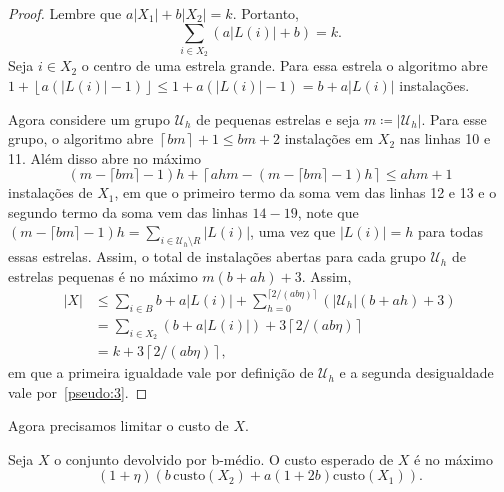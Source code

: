 \begin{proof}
    Lembre que $a|X_1| + b|X_2| = k$. Portanto,
    \begin{equation}
        \sum_{i \in X_2}(a|L(i)| + b) = k. \label{pseudo:3}
    \end{equation}
    Seja $i \in X_2$ o centro de uma estrela grande. %
    Para essa estrela o algoritmo abre ${1 + \left \lfloor a(|L(i)| - 1) \right \rfloor \leq 1 + a(|L(i)| - 1) = b + a|L(i)|}$ instalações.

    Agora considere um grupo $\mathcal{U}_h$ de pequenas estrelas e seja $m \coloneqq |\mathcal{U}_h|$. Para esse grupo, o algoritmo abre $\left \lceil bm \right \rceil + 1 \leq bm + 2 $ instalações em $X_2$ nas linhas 10 e 11. Além disso abre no máximo 
    \begin{equation}
        (m - \lceil bm \rceil -1 ) h + \left \lceil ahm - (m - \lceil bm \rceil - 1)h \right \rceil \leq ahm + 1 \nonumber
    \end{equation}
    instalações de $X_1$, em que o primeiro termo da soma vem das linhas 12 e 13 e o segundo termo da soma vem das linhas $14 - 19$, note que $(m - \lceil bm \rceil - 1)h = \sum_{i \in \mathcal{U}_h \setminus R} |L(i)|$, uma vez que $|L(i)| = h$ para todas essas estrelas. Assim, o total de instalações abertas para cada grupo $\mathcal{U}_h$ de estrelas pequenas é no máximo $m (b + ah) + 3$. Assim,
    \begin{align}
        |X| &\leq \sum_{i \in B} b + a|L(i)| + \sum_{h = 0}^{\lceil 2/(ab\eta)\rceil} \left( |\mathcal{U}_h| (b + ah) + 3 \right) \nonumber \\
        & = \sum_{i \in X_2 } (b + a |L(i)|) + 3 \left \lceil 2/(ab\eta) \right \rceil \nonumber \\
        & = k + 3 \left \lceil 2/(ab\eta) \right \rceil \nonumber,
    \end{align}
    em que a primeira igualdade vale por definição de $\mathcal{U}_h$ e a segunda desigualdade vale por~\eqref{pseudo:3}.
\end{proof}

Agora precisamos limitar o custo de $X$.

\begin{lemma}
    Seja $X$ o conjunto devolvido por {\sc b-médio}. O custo esperado de $X$ é no máximo 
    \[( 1 + \eta) (b\, \text{custo}(X_2) + a (1 + 2b)\text{custo}(X_1)).\]
\end{lemma}

